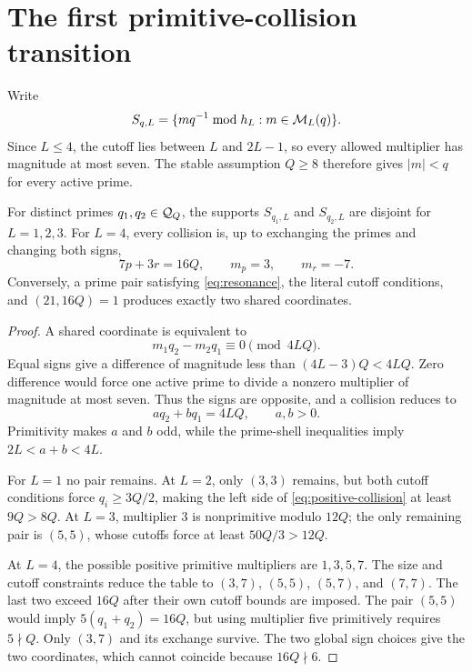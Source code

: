 \section{The first primitive-collision transition}

Write
\[
 S_{q,L}=\{m q^{-1}\bmod h_L:m\in\mathcal M_L(q)\}.
\]
Since $L\le4$, the cutoff lies between $L$ and $2L-1$, so every allowed multiplier
has magnitude at most seven.  The stable assumption $Q\ge8$ therefore gives
$|m|<q$ for every active prime.

\begin{theorem}
\label{thm:transition}
For distinct primes $q_1,q_2\in\mathcal Q_Q$, the supports $S_{q_1,L}$ and
$S_{q_2,L}$ are disjoint for $L=1,2,3$.  For $L=4$, every collision is, up to
exchanging the primes and changing both signs,
\begin{equation}
 7p+3r=16Q,\qquad m_p=3,\qquad m_r=-7.
 \label{eq:resonance}
\end{equation}
Conversely, a prime pair satisfying \eqref{eq:resonance}, the literal cutoff
conditions, and $(21,16Q)=1$ produces exactly two shared coordinates.
\end{theorem}

\begin{proof}
A shared coordinate is equivalent to
\[
 m_1q_2-m_2q_1\equiv0\pmod{4LQ}.
\]
Equal signs give a difference of magnitude less than $(4L-3)Q<4LQ$.  Zero
difference would force one active prime to divide a nonzero multiplier of magnitude at
most seven.  Thus the signs are opposite, and a collision reduces to
\begin{equation}
 a q_2+b q_1=4LQ,
 \qquad a,b>0.
 \label{eq:positive-collision}
\end{equation}
Primitivity makes $a$ and $b$ odd, while the prime-shell inequalities imply
$2L<a+b<4L$.

For $L=1$ no pair remains.  At $L=2$, only $(3,3)$ remains, but both cutoff
conditions force $q_i\ge3Q/2$, making the left side of
\eqref{eq:positive-collision} at least $9Q>8Q$.  At $L=3$, multiplier $3$ is
nonprimitive modulo $12Q$; the only remaining pair is $(5,5)$, whose cutoffs force
at least $50Q/3>12Q$.

At $L=4$, the possible positive primitive multipliers are $1,3,5,7$.  The size and
cutoff constraints reduce the table to $(3,7)$, $(5,5)$, $(5,7)$, and $(7,7)$.
The last two exceed $16Q$ after their own cutoff bounds are imposed.  The pair
$(5,5)$ would imply $5(q_1+q_2)=16Q$, but using multiplier five primitively requires
$5\nmid Q$.  Only $(3,7)$ and its exchange survive.  The two global sign choices give
the two coordinates, which cannot coincide because $16Q\nmid6$.
\end{proof}

